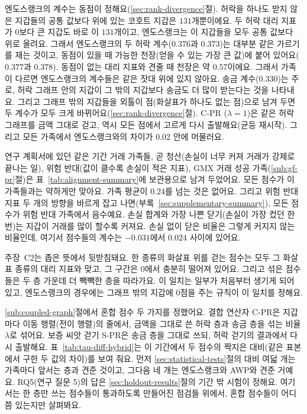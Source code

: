 엔도스랭크의 계수는 동점이 정해요(\ref{sec:rank-divergence}절). 허락을 하나도 받지 않은 지갑들의 공통 값보다 위에 있는 코호트 지갑은 $131$개뿐이에요. 두 허락 대리 지표가 0보다 큰 지갑도 바로 이 $131$개이고, 엔도스랭크는 이 지갑들을 모두 공통 값보다 위로 올려요. 그래서 엔도스랭크의 두 허락 계수($0.376$과 $0.373$)는 대부분 같은 가르기를 재는 것이고, 동점이 있을 때 가능한 천장(얻을 수 있는 가장 큰 값)에 붙어 있어요($0.377$과 $0.378$). 동점이 없는 대리 지표와 견줄 때 천장은 약 $0.57$이에요. 그래서 가족이 다르면 엔도스랭크의 계수들은 같은 잣대 위에 있지 않아요. 송금 계수($0.330$)는 주로, 허락 그래프 안의 지갑이 그 밖의 지갑보다 송금도 더 많이 받는다는 것을 나타내요. 그리고 그래프 밖의 지갑들을 외톨이 점(화살표가 하나도 없는 점)으로 남겨 두면 두 계수가 모두 크게 바뀌어요(\ref{sec:rank-divergence}절). C-PR ($\lambda=1$)은 같은 허락 그래프를 금액 그대로 걷고, 역시 모든 점에서 고르게 다시 출발해요(균등 재시작). 그리고 모든 가족에서 엔도스랭크와의 차이가 $0.02$ 안에 머물러요.

연구 계획서에 있던 같은 기간 거래 가족들, 곧 청산(손실이 너무 커져 거래가 강제로 끝나는 일), 위험 반대(값이 클수록 손실이 적은 지표), GMX 거래 성공 가족(\ref{sub:gf-pr}절)은 표~\ref{tab:alignment-summary}에 보관용으로 남겨 두었어요. 모든 점수가 이 가족들과는 약하게만 맞아요. 가족 평균이 $0.24$를 넘는 것은 없어요. 그리고 위험 반대 지표 두 개의 방향을 바르게 잡고 나면(부록~\ref{sec:supplementary-summary}), 모든 점수가 위험 반대 가족에서 음수예요. 손실 합계와 가장 나쁜 닫기(손실이 가장 컸던 한 번)는 지갑이 거래를 많이 할수록 커져요. 손실 없이 닫은 비율은 그렇게 커지지 않는 비율인데, 여기서 점수들의 계수는 $-0.031$에서 $0.024$ 사이에 있어요.

주장~C2는 좁은 뜻에서 뒷받침돼요. 한 종류의 화살표 위를 걷는 점수는 모두 그 화살표 종류의 대리 지표와 맞고, 그 구간은 0에서 충분히 떨어져 있어요. 그리고 섞은 점수들은 두 층 가운데 더 빽빽한 층을 따라가요. 이 일치는 일부가 처음부터 생기게 되어 있고, 엔도스랭크의 경우에는 그래프 밖의 지갑에 0점을 주는 규칙이 이 일치를 정해요.


\ref{sub:coupled-graph}절에서 혼합 점수 두 가지를 정했어요. 결합 연산자 C-PR은 지갑마다 이동 행렬(전이 행렬)의 줄에서, 금액을 그대로 쓴 허락 층과 송금 층을 섞는 비율 $\lambda$로 섞어요. 보증 씨앗 걷기 S-PR은 송금 층을 그대로 쓰되, 허락 걷기의 결과에서 다시 출발해요. 표~\ref{tab:tau-diff-hybrid}는 이 기간에서 두 점수의 짝지은 대비(같은 표본에서 구한 두 값의 차이)를 보여 줘요. 먼저 \ref{sec:statistical-tests}절의 대비 여덟 개는 가족마다 앞서는 층과 견준 것이고, 그다음 네 개는 엔도스랭크와 AWP와 견준 거예요. RQ5(연구 질문 5)의 답은 \ref{sec:holdout-results}절의 기간 밖 시험이 정해요. 여기서는 한 층만 쓰는 점수들이 통과하도록 만들어진 점검들 위에서, 혼합 점수들이 어디쯤 있는지만 살펴봐요.

